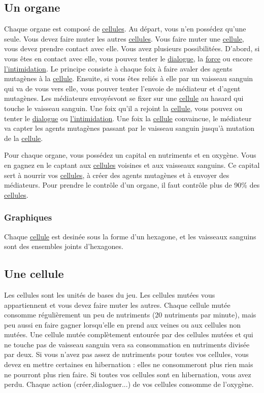 \documentclass{article}
\begin{document}
\subsection{Un organe}\label{organe}
Chaque organe est composé de \hyperref[cellule]{cellules}. Au départ, vous n'en possédez qu'une seule. Vous devez faire muter les autres \hyperref[cellule]{cellules}. Vous faire muter une \hyperref[cellule]{cellule}, vous devez prendre contact avec elle. Vous avez plusieurs possibilitées. D'abord, si vous êtes en contact avec elle, vous pouvez tenter le \hyperref[dialogue]{dialogue}, la \hyperref[force]{force} ou encore \hyperref[intimi]{l'intimidation}. Le principe consiste à chaque foix à faire avaler des agents mutagènes à la \hyperref[cellule]{cellule}. Ensuite, si vous êtes reliés à elle par un vaisseau sanguin qui va de vous vers elle, vous pouver tenter l'envoie de médiateur et d'agent mutagènes. Les médiateurs envoyésvont se fixer sur une \hyperref[cellule]{cellule} au hasard qui touche le vaisseau sanguin. Une foix qu'il a rejoint la \hyperref[cellule]{cellule}, vous pouvez ou tenter le \hyperref[dialogue]{dialogue} ou \hyperref[intimi]{l'intimidation}. Une foix la \hyperref[cellule]{cellule} convaincue, le médiateur va capter les agents mutagènes passant par le vaisseau sanguin jusqu'à mutation de la \hyperref[cellule]{cellule}.

Pour chaque organe, vous possédez un capital en nutriments et en oxygène. Vous en gagnez en le captant aux \hyperref[cellule]{cellules} voisines et aux vaisseaux sanguins. Ce capital sert à nourrir vos \hyperref[cellule]{cellules}, à créer des agents mutagènes et à envoyer des médiateurs. Pour prendre le contrôle d'un organe, il faut contrôle plus de 90\% des \hyperref[cellule]{cellules}.

\subsubsection{Graphiques}
Chaque \hyperref[cellule]{cellule} est desinée sous la forme d'un hexagone, et les vaisseaux sanguins sont des ensembles joints d'hexagones.

\subsection{Une cellule}\label{cellule}
Les cellules sont les unités de bases du jeu. Les cellules mutées vous appartiennent et vous devez faire muter les autres. Chaque cellule mutée consomme régulièrement un peu de nutriments (20 nutriments par minute), mais peu aussi en faire gagner lorsqu'elle en prend aux veines ou aux cellules non mutées. Une cellule mutée complètement entourée par des cellules mutées et qui ne touche pas de vaisseau sanguin vera sa consommation en nutriments divisée par deux. Si vous n'avez pas assez de nutriments pour toutes vos cellules, vous devez en mettre certaines en hibernation : elles ne consommeront plus rien mais ne pourront plus rien faire. Si toutes vos cellules sont en hibernation, vous avez perdu. Chaque action (créer,dialoguer...) de vos cellules consomme de l'oxygène.
\end{document}
